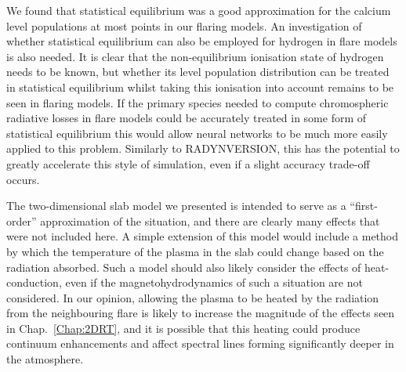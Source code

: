 We found that statistical equilibrium was a good approximation for the calcium level populations at most points in our flaring models.
An investigation of whether statistical equilibrium can also be employed for hydrogen in flare models is also needed.
It is clear that the non-equilibrium ionisation state of hydrogen needs to be known, but whether its level population distribution can be treated in statistical equilibrium whilst taking this ionisation into account remains to be seen in flaring models.
If the primary species needed to compute chromospheric radiative losses in flare models could be accurately treated in some form of statistical equilibrium this would allow neural networks to be much more easily applied to this problem.
Similarly to RADYNVERSION, this has the potential to greatly accelerate this style of simulation, even if a slight accuracy trade-off occurs.

The two-dimensional slab model we presented is intended to serve as a ``first-order'' approximation of the situation, and there are clearly many effects that were not included here.
A simple extension of this model would include a method by which the temperature of the plasma in the slab could change based on the radiation absorbed.
Such a model should also likely consider the effects of heat-conduction, even if the magnetohydrodynamics of such a situation are not considered.
In our opinion, allowing the plasma to be heated by the radiation from the neighbouring flare is likely to increase the magnitude of the effects seen in Chap.~\ref{Chap:2DRT}, and it is possible that this heating could produce continuum enhancements and affect spectral lines forming significantly deeper in the atmosphere.


